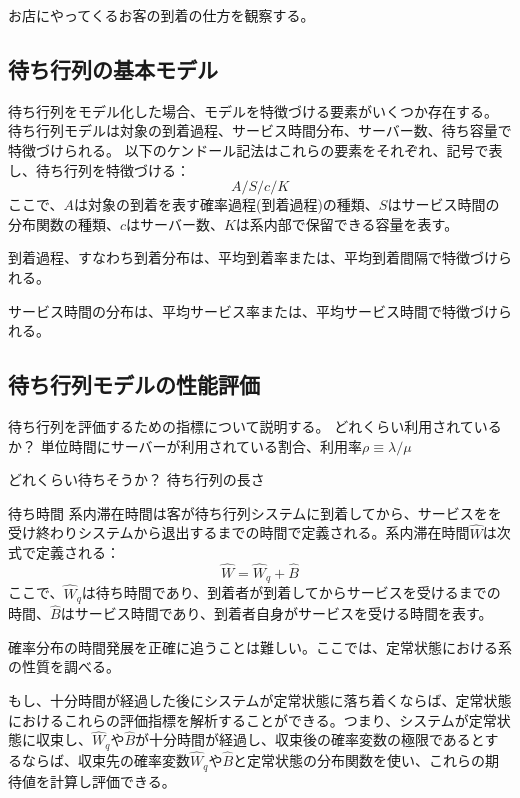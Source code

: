 お店にやってくるお客の到着の仕方を観察する。




\subsection{待ち行列の基本モデル}
待ち行列をモデル化した場合、モデルを特徴づける要素がいくつか存在する。
待ち行列モデルは対象の到着過程、サービス時間分布、サーバー数、待ち容量で特徴づけられる。
以下のケンドール記法はこれらの要素をそれぞれ、記号で表し、待ち行列を特徴づける：
\begin{equation}
    A/S/c/K
\end{equation}
ここで、$A$は対象の到着を表す確率過程(到着過程)の種類、$S$はサービス時間の分布関数の種類、$c$はサーバー数、$K$は系内部で保留できる容量を表す。

到着過程、すなわち到着分布は、平均到着率または、平均到着間隔で特徴づけられる。

サービス時間の分布は、平均サービス率または、平均サービス時間で特徴づけられる。



\subsection{待ち行列モデルの性能評価}

待ち行列を評価するための指標について説明する。
どれくらい利用されているか？
単位時間にサーバーが利用されている割合、利用率$\rho\equiv\lambda/\mu$

どれくらい待ちそうか？
待ち行列の長さ


待ち時間
系内滞在時間は客が待ち行列システムに到着してから、サービスをを受け終わりシステムから退出するまでの時間で定義される。系内滞在時間$\hat{W}$は次式で定義される：
\begin{equation}
    \hat{W} = \hat{W}_{q} + \hat{B}
\end{equation}
ここで、$\hat{W}_{q}$は待ち時間であり、到着者が到着してからサービスを受けるまでの時間、$\hat{B}$はサービス時間であり、到着者自身がサービスを受ける時間を表す。

確率分布の時間発展を正確に追うことは難しい。ここでは、定常状態における系の性質を調べる。

もし、十分時間が経過した後にシステムが定常状態に落ち着くならば、定常状態におけるこれらの評価指標を解析することができる。つまり、システムが定常状態に収束し、$\hat{W}_{q}$や$\hat{B}$が十分時間が経過し、収束後の確率変数の極限であるとするならば、収束先の確率変数$\hat{W}_{q}$や$\hat{B}$と定常状態の分布関数を使い、これらの期待値を計算し評価できる。

